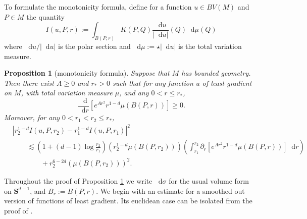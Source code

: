 \documentclass[reqno,11pt]{amsart}
\newcommand{\Sph}{\mathbf S}
\newcommand*\dif{\mathop{}\!\mathrm{d}}
\newtheorem{proposition}[theorem]{Proposition}
\theoremstyle{definition}
\numberwithin{equation}{section}
\begin{document}
To formulate the monotonicity formula, define for a function $u \in BV(M)$ and $P \in M$ the quantity
\begin{equation}\label{integral of du}
I(u, P, r) := \int_{B(P, r)} K(P, Q) \frac{\dif u}{|\dif u|}(Q) \dif \mu(Q)
\end{equation}
where $\dif u/|\dif u|$ is the polar section and $\dif \mu := \star|\dif u|$ is the total variation measure.

\begin{proposition}[monotonicity formula]\label{Monotone}
Suppose that $M$ has bounded geometry.
Then there exist $A \geq 0$ and $r_* > 0$ such that for any function $u$ of least gradient on $M$, with total variation measure $\mu$, and any $0 < r \leq r_*$,
\begin{equation}\label{weak monotonicity}
\frac{\dif}{\dif r}\left[e^{Ar^2}r^{1 - d} \mu(B(P, r))\right] \geq 0.
\end{equation}
Moreover, for any $0 < r_1 < r_2 \leq r_*$,
\begin{align*}
&|r_2^{1 - d} I(u, P, r_2) - r_1^{1 - d} I(u, P, r_1)|^2 \\
&\qquad \lesssim \left(1 + (d - 1) \log \frac{r_2}{r_1}\right) \left(r_2^{1 - d}\mu(B(P, r_2)) \right)
\left(\int_{r_1}^{r_2} \partial_r \left[e^{Ar^2} r^{1 - d} \mu(B(P, r))\right] \dif r\right)\\
&\qquad \qquad + r_2^{6-2d} \left(\mu(B(P, r_2))\right)^2.
\end{align*}
\end{proposition}

Throughout the proof of Proposition \ref{Monotone} we write $\dif \sigma$ for the usual volume form on $\Sph^{d - 1}$, and $B_r := B(P, r)$.
We begin with an estimate for a smoothed out version of functions of least gradient.
Its euclidean case can be isolated from the proof of \cite[Lemma 5.8]{Giusti77}.
\end{document}
